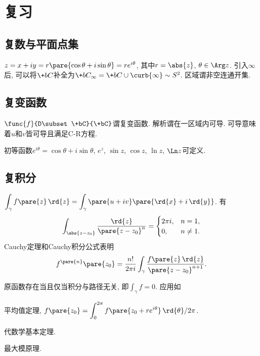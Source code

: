 \documentclass[../ComplexVariable.tex]{subfiles}
\begin{document}
\section{复习} %
\label{sec:复习}

\subsection{复数与平面点集} %
\label{sub:复数与平面点集}

$z=x+iy=r\pare{\cos\theta+i\sin\theta}=re^{i\theta}$, 其中$r=\abs{z}$, $\theta\in\Arg z$. 引入$\infty$后, 可以将$\+bC$补全为$\+bC_\infty = \+bC\cup\curb{\infty} \sim S^2$. 区域谓非空连通开集.


\subsection{复变函数} %
\label{sub:复变函数}

$\func{f}{D\subset \+bC}{\+bC}$谓复变函数. 解析谓在一区域内可导. 可导意味着$u$和$v$皆可导且满足C-R方程.
\par
初等函数$e^{i\theta} = \cos\theta + i\sin\theta$, $e^z$, $\sin z$, $\cos z$, $\ln z$, $\Ln z$可定义.


\subsection{复积分} %
\label{sub:复积分}

$\displaystyle \int_\gamma f\pare{z}\,\rd{z} = \int_\gamma \pare{u+iv}\pare{\rd{x} + i\,\rd{y}}$. 有
\[ \int_{\abs{z-z_0}} \frac{\rd{z}}{\pare{z-z_0}^n} = \begin{cases}
    2\pi i, & n=1, \\
    0, & n\neq 1.
\end{cases} \]
Cauchy定理和Cauchy积分公式表明
\[ f^{\pare{n}}\pare{z_0} = \frac{n!}{2\pi i}\int_\gamma \frac{f\pare{z}\,\rd{z}}{\pare{z-z_0}^{n+1}}. \]
\par
原函数存在当且仅当积分与路径无关, 即$\int_\gamma f = 0$. 应用如
\begin{cenum}
    \item 平均值定理, $\displaystyle f\pare{z_0} = \int_0^{2\pi} f\pare{z_0+re^{i\theta}}\,\rd{\theta}/2\pi$.
    \item 代数学基本定理.
    \item 最大模原理.
\end{cenum}
\end{document}
